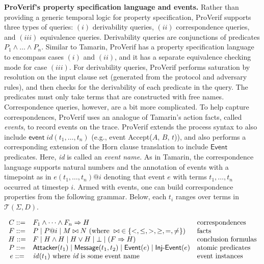 \documentclass{article}
\theoremstyle{definition}
\begin{document}
\textbf{ProVerif's property specification language and events.}
Rather than providing a generic temporal logic for property specification, 
ProVerif supports three types of queries: $(i)$ derivability queries, $(ii)$ correspondence queries, and $(iii)$ equivalence queries. 
Derivability queries are conjunctions of predicates $P_1 \land \dots \land P_n$.
Similar to Tamarin, ProVerif has a property specification language to encompass cases $(i)$ and $(ii)$, and it has a separate equivalence checking mode for case $(iii)$. For derivability queries, ProVerif performs saturation by resolution on the input clause set (generated from the protocol and adversary rules), and then checks for the derivability of each predicate in the query. The predicates must only take terms that are constructed with free names.
Correspondence queries, however, are a bit more complicated. To help capture correspondences, ProVerif uses an analogue of Tamarin's action facts, called \emph{events}, to record events on the trace. ProVerif extends the process syntax to also include $\mathsf{event}\; \mathit{id}(t_1, \dots, t_n)$ (e.g., \textsf{event} \textsf{Accept}($A$, $B$, $t$)), 
and also performs a corresponding extension of the Horn clause translation to include 
$\textsf{Event}$ predicates. Here, \emph{id} is called an \emph{event name}.
As in Tamarin, the correspondence language supports natural numbers and the annotation of events with a timepoint as in $e(t_1, \dots, t_n)@i$ denoting that event $e$ with terms $t_1, \dots, t_n$ occurred at timestep $i$. 
Armed with events, one can build correspondence properties from the following grammar. Below, each $t_i$ ranges over terms in $\mathcal{T}(\Sigma, D)$.

$
\begin{array}{cll}
   C ::= & F_1 \land \dots \land F_n \Rightarrow H & \text{correspondences} \\
   F ::= &  P \mid P@i \mid M \bowtie N \text { (where } \bowtie\; \in \{<, \leq, >, \geq, =, \neq\}) & \text{facts} \\ 
   H ::= & F \mid H \land H \mid H \lor H \mid \bot \mid (F \Rightarrow H) & \text{conclusion formulas}\\ 
   P ::= & \textsf{Attacker}(t_1) \mid \textsf{Message}(t_1, t_2) \mid \textsf{Event}(e) \mid \textsf{Inj\mbox{-}Event}(e) & \text{atomic predicates}\\ 
   e ::= & \mathit{id}(t_1) \text{ where }\textit{id}\text{ is some event name} & \text{event instances}
\end{array}
$
\end{document}
